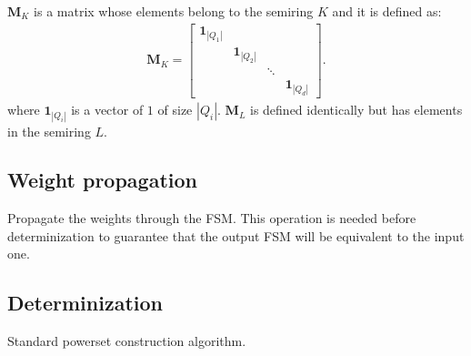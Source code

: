 $\mathbf{M}_K$ is a matrix whose elements belong to the semiring $K$
and it is defined as:
\begin{align}
    \mathbf{M}_K = \begin{bmatrix}
        \mathbf{1}_{|Q_1|} & & & \\
        & \mathbf{1}_{|Q_2|} & & \\
        & & \ddots & \\
        & & & \mathbf{1}_{|Q_d|}
    \end{bmatrix}.
\end{align}
where $\mathbf{1}_{|Q_i|}$ is a vector of $1$ of size $|Q_i|$. $\mathbf{M}_L$
is defined identically but has elements in the semiring $L$.

\subsection{Weight propagation}

Propagate the weights through the FSM. This operation is needed
before determinization to guarantee that the output FSM will be
equivalent to the input one.

\subsection{Determinization}

Standard powerset construction algorithm.

